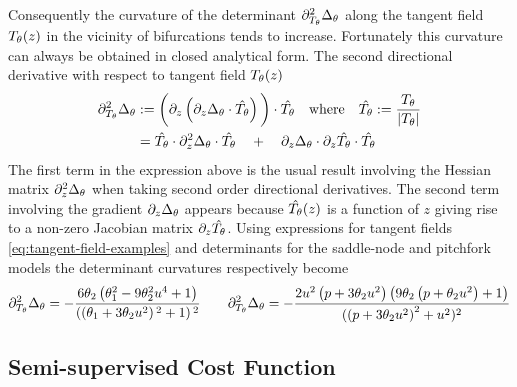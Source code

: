 Consequently the curvature of the determinant $\partial_{T_{\theta}}^2\Delta_{\theta}$ along the tangent field $T_{\theta}(z)$ in the vicinity of bifurcations tends to increase. Fortunately this curvature can always be obtained in closed analytical form. The second directional derivative with respect to tangent field $T_{\theta}(z)$
\begin{align}
    \partial_{T_{\theta}}^2\Delta_{\theta} &:=
    \bigg(
        \partial_z\left(
            \partial_z\Delta_{\theta} \cdot \hat{T_{\theta}}
        \right)
    \bigg)\cdot \hat{T_{\theta}}\quad
    \mathrm{where} \quad \hat{T_{\theta}}:=\frac{T_{\theta}}{|T_{\theta}|}\\
    &=
    \hat{T_{\theta}}\cdot\partial_z^2\Delta_{\theta}\cdot\hat{T_{\theta}}
    \quad+\quad
    \partial_z\Delta_{\theta}\cdot\partial_z\hat{T_{\theta}}\cdot\hat{T_{\theta}}
\end{align}
The first term in the expression above is the usual result involving the Hessian matrix $\partial_z^2\Delta_{\theta}$ when taking second order directional derivatives. The second term involving the gradient $\partial_z\Delta_{\theta}$ appears because $\hat{T_{\theta}}(z)$ is a function of $z$ giving rise to a non-zero Jacobian matrix $\partial_z \hat{T_{\theta}}$. Using expressions for tangent fields \eqref{eq:tangent-field-examples} and determinants for the saddle-node and pitchfork models the determinant curvatures respectively become
\begin{align}
    \partial_{T_{\theta}}^2\Delta_{\theta} =
    -\frac{6 \theta_2 \left(\theta _1^2-9 \theta _2^2 u^4+1\right)}
    {\left(\left(\theta _1+3 \theta _2 u^2\right){}^2+1\right){}^2}
    \qquad
    \partial_{T_{\theta}}^2\Delta_{\theta} =
    -\frac{2 u^2 \left(p+3 \theta _2 u^2\right) \left(9 \theta _2 \left(p+\theta _2 u^2\right)+1\right)}{
    ( \left(p+3 \theta _2 u^2\right)^2+u^2 )^2
    }
\end{align}
\subsection{Semi-supervised Cost Function}

